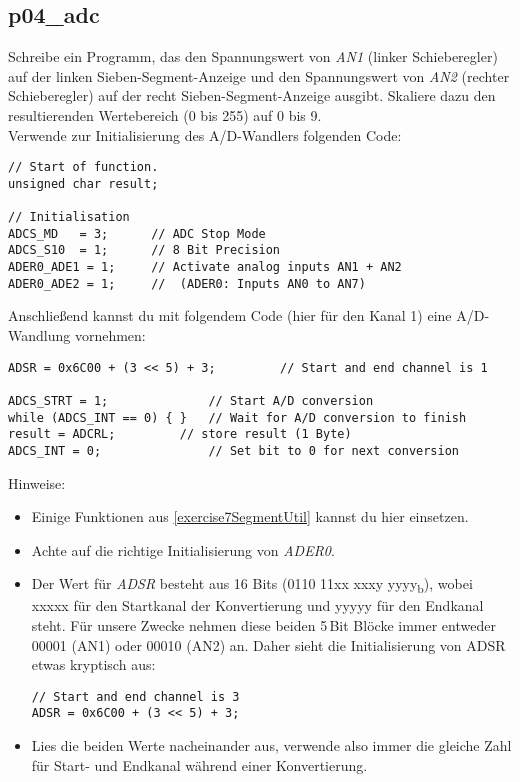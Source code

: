 \subsection{p04\_adc}
Schreibe ein Programm, das den Spannungswert von \emph{AN1} (linker Schieberegler) auf der linken Sieben-Segment-Anzeige und den Spannungswert von \emph{AN2} (rechter Schieberegler) auf der recht Sieben-Segment-Anzeige ausgibt.
Skaliere dazu den resultierenden Wertebereich (0 bis 255) auf 0 bis 9.\\

Verwende zur Initialisierung des A/D-Wandlers folgenden Code:
\begin{lstlisting}
// Start of function.
unsigned char result;

// Initialisation
ADCS_MD   = 3;		// ADC Stop Mode
ADCS_S10  = 1;		// 8 Bit Precision
ADER0_ADE1 = 1;	    // Activate analog inputs AN1 + AN2
ADER0_ADE2 = 1;     //  (ADER0: Inputs AN0 to AN7)
\end{lstlisting}
Anschließend kannst du mit folgendem Code (hier für den Kanal 1) eine A/D-Wandlung vornehmen:
\begin{lstlisting}
ADSR = 0x6C00 + (3 << 5) + 3;	      // Start and end channel is 1

ADCS_STRT = 1;				// Start A/D conversion
while (ADCS_INT == 0) { }	// Wait for A/D conversion to finish
result = ADCRL;			// store result (1 Byte)
ADCS_INT = 0;				// Set bit to 0 for next conversion
\end{lstlisting}

Hinweise:
\begin{itemize}
\item 
Einige Funktionen aus \ref{exercise7SegmentUtil} kannst du hier einsetzen.

\item 
Achte auf die richtige Initialisierung von \textit{ADER0}.

\item Der Wert für \textit{ADSR} besteht aus 16 Bits (0110 11xx xxxy yyyy\textsubscript{b}), wobei xxxxx für den Startkanal der Konvertierung und yyyyy für den Endkanal steht. Für unsere Zwecke nehmen diese beiden 5\,Bit Blöcke immer entweder 00001 (AN1) oder 00010 (AN2) an.
Daher sieht die Initialisierung von ADSR etwas kryptisch aus:
\begin{verbatim}
// Start and end channel is 3
ADSR = 0x6C00 + (3 << 5) + 3;
\end{verbatim}

\item
Lies die beiden Werte nacheinander aus, verwende also immer die gleiche Zahl für Start- und Endkanal während einer Konvertierung.

\end{itemize}

